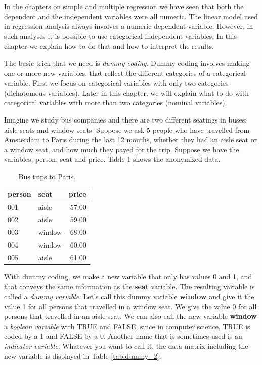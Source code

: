 \documentclass[]{report}\usepackage[]{graphicx}\usepackage[]{color}
\begin{document}
In the chapters on simple and multiple regression we have seen that both the dependent and the independent variables were all numeric. The linear model used in regression analysis always involves a numeric dependent variable. However, in such analyses it is possible to use categorical independent variables. In this chapter we explain how to do that and how to interpret the results. 

The basic trick that we need is \textit{dummy coding}. Dummy coding involves making one or more new variables, that reflect the different categories of a categorical variable. First we focus on categorical variables with only two categories (dichotomous variables). Later in this chapter, we will explain what to do with categorical variables with more than two categories (nominal variables). 

Imagine we study bus companies and there are two different seatings in buses: aisle seats and window seats. Suppose we ask 5 people who have travelled from Amsterdam to Paris during the last 12 months, whether they had an aisle seat or a window seat, and how much they payed for the trip. Suppose we have the variables, person, seat and price. Table \ref{tab:dummy_1} shows the anonymized data.

\begin{table}[ht]
\centering
\caption{Bus trips to Paris.} 
\label{tab:dummy_1}
\begin{tabular}{llr}
  \hline
person & seat & price \\ 
  \hline
001 & aisle & 57.00 \\ 
  002 & aisle & 59.00 \\ 
  003 & window & 68.00 \\ 
  004 & window & 60.00 \\ 
  005 & aisle & 61.00 \\ 
   \hline
\end{tabular}
\end{table}



With dummy coding, we make a new variable that only has values 0 and 1, and that conveys the same information as the \textbf{seat} variable. The resulting variable is called a \textit{dummy variable}. Let's call this dummy variable \textbf{window} and give it the value 1 for all persons that travelled in a window seat. We give the value 0 for all persons that travelled in an aisle seat. We can also call the new variable \textbf{window} a \textit{boolean variable} with TRUE and FALSE, since in computer science, TRUE is coded by a 1 and FALSE by a 0. Another name that is sometimes used is an \textit{indicator variable}. Whatever you want to call it, the data matrix including the new variable is displayed in Table \ref{tab:dummy_2}.
\end{document}
